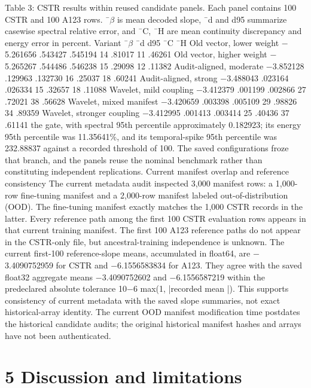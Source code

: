 \documentclass[11pt]{article}
\begin{document}
Table 3: CSTR results within reused candidate panels. Each panel contains 100 CSTR and 100
A123 rows. ¯\ensuremath{\beta} is mean decoded slope, ¯d and d95 summarize casewise spectral relative error, and
¯C, ¯H are mean continuity discrepancy and energy error in percent.
Variant ¯\ensuremath{\beta} ¯d d95 ¯C ¯H
Old vector, lower weight \ensuremath{-}5.261656 .543427 .545194 14 .81017 11 .46261
Old vector, higher weight \ensuremath{-}5.265267 .544486 .546238 15 .29098 12 .11382
Audit-aligned, moderate \ensuremath{-}3.852128 .129963 .132730 16 .25037 18 .60241
Audit-aligned, strong \ensuremath{-}3.488043 .023164 .026334 15 .32657 18 .11088
Wavelet, mild coupling \ensuremath{-}3.412379 .001199 .002866 27 .72021 38 .56628
Wavelet, mixed manifest \ensuremath{-}3.420659 .003398 .005109 29 .98826 34 .89359
Wavelet, stronger coupling \ensuremath{-}3.412995 .001413 .003414 25 .40436 37 .61141
the gate, with spectral 95th percentile approximately 0.182923; its energy 95th percentile was
11.35641\%, and its temporal-spike 95th percentile was 232.88837 against a recorded threshold of
100. The saved configurations froze that branch, and the panels reuse the nominal benchmark
rather than constituting independent replications.
Current manifest overlap and reference consistency
The current metadata audit inspected 3,000 manifest rows: a 1,000-row fine-tuning manifest and
a 2,000-row manifest labeled out-of-distribution (OOD). The fine-tuning manifest exactly matches
the 1,000 CSTR records in the latter. Every reference path among the first 100 CSTR evaluation
rows appears in that current training manifest. The first 100 A123 reference paths do not appear
in the CSTR-only file, but ancestral-training independence is unknown.
The current first-100 reference-slope means, accumulated in float64, are \ensuremath{-}3.4090752959 for CSTR
and \ensuremath{-}6.1556583834 for A123. They agree with the saved float32 aggregate means \ensuremath{-}3.4090752602
and \ensuremath{-}6.1556587219 within the predeclared absolute tolerance 10\ensuremath{-}6 max(1, |recorded mean |). This
supports consistency of current metadata with the saved slope summaries, not exact historical-array
identity. The current OOD manifest modification time postdates the historical candidate audits;
the original historical manifest hashes and arrays have not been authenticated.

\section*{5 Discussion and limitations}
\end{document}
